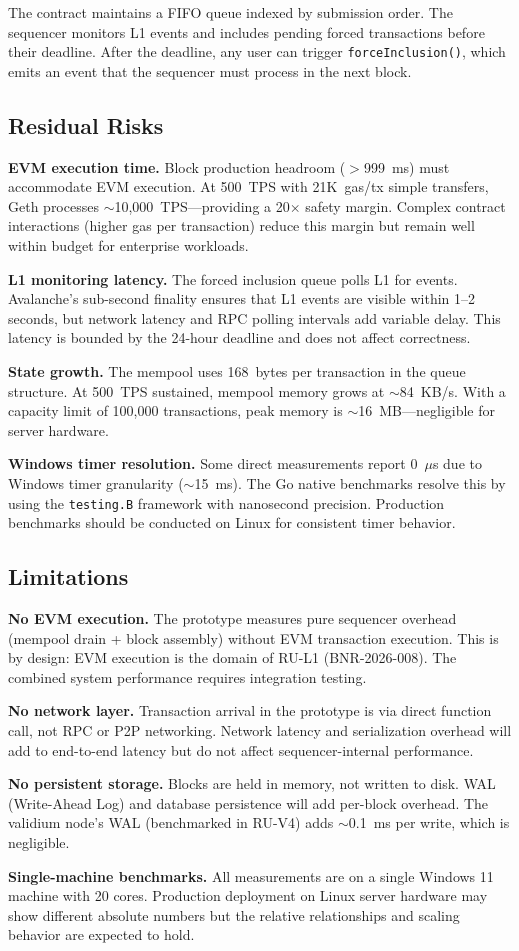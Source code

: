The contract maintains a FIFO queue indexed by submission order. The sequencer monitors
L1 events and includes pending forced transactions before their deadline. After the
deadline, any user can trigger \texttt{forceInclusion()}, which emits an event that
the sequencer must process in the next block.

\subsection{Residual Risks}

\textbf{EVM execution time.} Block production headroom ($>$999~ms) must accommodate
EVM execution. At 500~TPS with 21K~gas/tx simple transfers, Geth processes
${\sim}$10{,}000~TPS---providing a 20$\times$ safety margin. Complex contract
interactions (higher gas per transaction) reduce this margin but remain well within
budget for enterprise workloads.

\textbf{L1 monitoring latency.} The forced inclusion queue polls L1 for events.
Avalanche's sub-second finality ensures that L1 events are visible within 1--2 seconds,
but network latency and RPC polling intervals add variable delay. This latency is
bounded by the 24-hour deadline and does not affect correctness.

\textbf{State growth.} The mempool uses 168~bytes per transaction in the queue
structure. At 500~TPS sustained, mempool memory grows at ${\sim}$84~KB/s. With a
capacity limit of 100{,}000 transactions, peak memory is ${\sim}$16~MB---negligible
for server hardware.

\textbf{Windows timer resolution.} Some direct measurements report 0~$\mu$s due to
Windows timer granularity (${\sim}$15~ms). The Go native benchmarks resolve this by
using the \texttt{testing.B} framework with nanosecond precision. Production benchmarks
should be conducted on Linux for consistent timer behavior.

\subsection{Limitations}

\textbf{No EVM execution.} The prototype measures pure sequencer overhead (mempool
drain + block assembly) without EVM transaction execution. This is by design: EVM
execution is the domain of RU-L1 (BNR-2026-008). The combined system performance
requires integration testing.

\textbf{No network layer.} Transaction arrival in the prototype is via direct function
call, not RPC or P2P networking. Network latency and serialization overhead will add
to end-to-end latency but do not affect sequencer-internal performance.

\textbf{No persistent storage.} Blocks are held in memory, not written to disk. WAL
(Write-Ahead Log) and database persistence will add per-block overhead. The validium
node's WAL (benchmarked in RU-V4) adds ${\sim}$0.1~ms per write, which is negligible.

\textbf{Single-machine benchmarks.} All measurements are on a single Windows 11
machine with 20 cores. Production deployment on Linux server hardware may show
different absolute numbers but the relative relationships and scaling behavior
are expected to hold.
